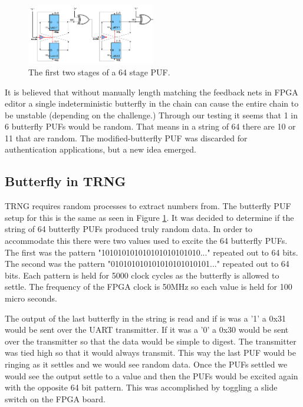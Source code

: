 		\begin{figure}[h]
			\centering
			\includegraphics[width=0.5\textwidth]{bflyString.png}
			\caption{The first two stages of a 64 stage PUF.}\label{fig:bfly3}
		\end{figure}	
			
		It is believed that without manually length matching the feedback nets in FPGA editor a single indeterministic butterfly in the chain can cause the entire chain to be unstable (depending on the challenge.)  Through our testing it seems that 1 in 6 butterfly PUFs would be random.  That means in a string of 64 there are 10 or 11 that are random.  The modified-butterfly PUF was discarded for authentication applications, but a new idea emerged.

	\subsection{Butterfly in TRNG}
		TRNG requires random processes to extract numbers from. The butterfly PUF setup for this is the same as seen in Figure \ref{fig:bfly3}.  It was decided to determine if the string of 64 butterfly PUFs produced truly random data.  In order to accommodate this there were two values used to excite the 64 butterfly PUFs.  The first was the pattern "101010101010101010101010..." repeated out to 64 bits.  The second was the pattern "010101010101010101010101..." repeated out to 64 bits.  Each pattern is held for 5000 clock cycles as the butterfly is allowed to settle. The frequency of the FPGA clock is 50MHz so each value is held for 100 micro seconds.
		
		The output of the last butterfly in the string is read and if is was a '1' a 0x31 would be sent over the UART transmitter.  If it was a '0' a 0x30 would be sent over the transmitter so that the data would be simple to digest.  The transmitter was tied high so that it would always transmit.  This way the last PUF would be ringing as it settles and we would see random data.  Once the PUFs settled we would see the output settle to a value and then the PUFs would be excited again with the opposite 64 bit pattern.  This was accomplished by toggling a slide switch on the FPGA board.
		
